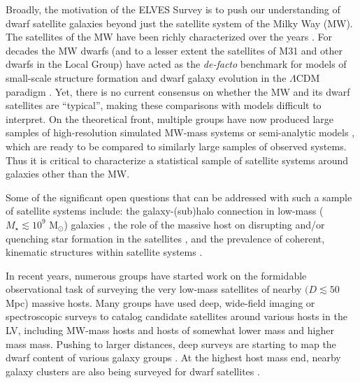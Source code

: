 \documentclass[twocolumn]{aastex62}
\newcommand{\msun}{M$_\odot$}
\begin{document}
Broadly, the motivation of the ELVES Survey is to push our understanding of dwarf satellite galaxies beyond just the satellite system of the Milky Way (MW). The satellites of the MW have been richly characterized over the years \citep[e.g. see][and references therein]{mateo1998, koposov2008, simon2019, drlica2020}. For decades the MW dwarfs (and to a lesser extent the satellites of M31 and other dwarfs in the Local Group) have acted as the \textit{de-facto} benchmark for models of small-scale structure formation and dwarf galaxy evolution in the $\Lambda$CDM paradigm \citep[e.g.][]{klypin1999, moore1999, mayer2006, bk2011, bk2012, brooks2013, brooks2014, elvis, sawala2016, wetzel2016, bullock2017,  pawlowski2018, nadler2020}. Yet, there is no current consensus on whether the MW and its dwarf satellites are ``typical'', making these comparisons with models difficult to interpret.  On the theoretical front, multiple groups have now produced large samples of high-resolution simulated MW-mass systems \citep{simpson2018, gk2019, applebaum2020, libeskind2020, font2020, font2021, engler2021} or semi-analytic models \citep{jiang2020}, which are ready to be compared to similarly large samples of observed systems. Thus it is critical to characterize a statistical sample of satellite systems around galaxies other than the MW.


Some of the significant open questions that can be addressed with such a sample of satellite systems include: the galaxy-(sub)halo connection in low-mass ($M_\star\lesssim 10^9$ \msun) galaxies \citep{kim2018, nadler2019, munshi2021}, the role of the massive host on disrupting and/or quenching star formation in the satellites \citep{wetzel2015, fillingham2015, hausammann2019, samuel2020, akins2021, font2021b}, and the prevalence of coherent, kinematic structures within satellite systems \citep{pawlowskiVPOS, pawlowski2020, ibataGPOA, muller_plane}.



In recent years, numerous groups have started work on the formidable observational task of surveying the very low-mass satellites of nearby $(D\lesssim 50$ Mpc) massive hosts. Many groups have used deep, wide-field imaging or spectroscopic surveys to catalog candidate satellites around various hosts in the LV, including MW-mass hosts \citep[e.g][]{irwin2009, kim2011, sales2013, spencer2014, merritt2014, karachentsev2015, bennet2017, bennet2019, bennet2020, tanaka2017, danieli2017, danieli2020, smercina2018, kondapally2018, park2017, park2019, byun2020, davis2021, garling2021, mutlu2021} and hosts of somewhat lower mass \citep{madcash, carlin2021, muller2020_low_mass, drlica2021} and higher mass \citep{stierwalt2009, trentham2009, chiboucas2009, chiboucas2013, crnojevic2014, crnojevic2016, crnojevic2019, muller2015, muller2017, muller2018, muller2019, muller2021, smercina2017, cohen2018} mass. Pushing to larger distances, deep surveys are starting to map the dwarf content of various galaxy groups \citep[e.g.][]{greco2018, zaritsky2019, habas2020, tanoglidis2021, prole2021}. At the highest host mass end, nearby galaxy clusters are also being surveyed for dwarf satellites \citep{ferrarese2012, ferrarese2016, ferrarese2020, munoz2015, eigenthaler2018, venhola2018, venhola2021, su2021, lamarca2021}.
\end{document}
